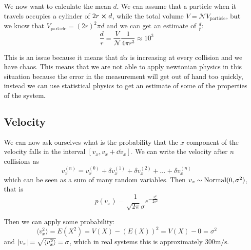 \documentclass[12pt]{extarticle}
\newcommand{\anglebraces}[1]{
    \langle #1 \rangle
}
\begin{document}
We now want to calculate the mean $d$.
We can assume that a particle when it travels occupies a cylinder of $2r \cross d$, while the total volume $V = \mathscr{N} V_\text{particle}$, but we know that $V_\text{particle} = (2r)^2 \pi d$ and we can get an estimate of $\frac{d}{r}$:
\begin{equation}
    \frac{d}{r} = \frac{V}{\mathscr{N}} \frac{1}{4 \pi r^3} \approx 10^3
\end{equation}

This is an issue because it means that $\dd{\alpha}$ is increasing at every collision and we have chaos.
This means that we are not able to apply newtonian physics in this situation because the error in the measurement will get out of hand too quickly,
instead we can use statistical physics to get an estimate of some of the properties of the system.

\subsection{Velocity}

We can now ask ourselves what is the probability that the $x$ component of the velocity falls in the interval $[v_x, v_x + \dd{v_x}]$.
We can write the velocity after $n$ collisions as
\begin{equation}
    v_x^{(n)} = v_x^{(0)} + \delta v_x^{(1)} + \delta v_x^{(2)} + \dots +\delta v_x^{(n)}
\end{equation}
which can be seen as a sum of many random variables.
Then $v_x \sim {\operatorfont Normal}(0, \sigma^2)$, that is
\begin{equation}
    p(v_x) = \frac{1}{\sqrt{2 \pi} \sigma} e^{-\frac{v_x^2}{2 \sigma^2}}
\end{equation}

Then we can apply some probability:
\begin{equation}
    \anglebraces{v_x^2} = E(X^2) = V(X) - (E(X))^2 = V(X) - 0 = \sigma^2
\end{equation}
and $\abs{v_x} = \sqrt{\anglebraces{v_x^2}} = \sigma$, which in real systems this is approximately $300 \si{\meter \per \second}$.
\end{document}
